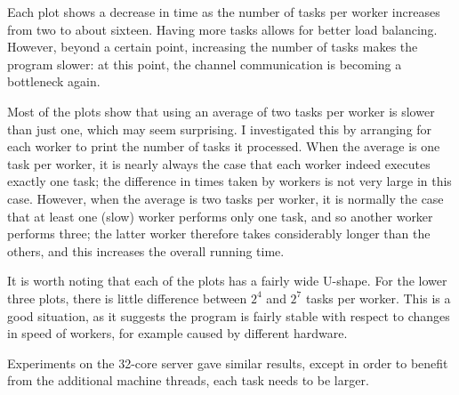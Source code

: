 Each plot shows a decrease in time as the number of tasks per worker increases
from two to about sixteen.  Having more tasks allows for better load
balancing.  However, beyond a certain point, increasing the number of tasks
makes the program slower: at this point, the channel communication is becoming
a bottleneck again.

Most of the plots show that using an average of two tasks per worker is slower
than just one, which may seem surprising.  I investigated this by arranging
for each worker to print the number of tasks it processed.  When the average
is one task per worker, it is nearly always the case that each worker indeed
executes exactly one task; the difference in times taken by workers is not
very large in this case.  However, when the average is two tasks per worker,
it is normally the case that at least one (slow) worker performs only one
task, and so another worker performs three; the latter worker therefore takes
considerably longer than the others, and this increases the overall running
time.

It is worth noting that each of the plots has a fairly wide U-shape.  For the
lower three plots, there is little difference between $2^4$ and $2^7$ tasks
per worker.  This is a good situation, as it suggests the program is fairly
stable with respect to changes in speed of workers, for example caused by
different hardware. 

Experiments on the 32-core server gave similar results, except in order to
benefit from the additional machine threads, each task needs to be larger.


